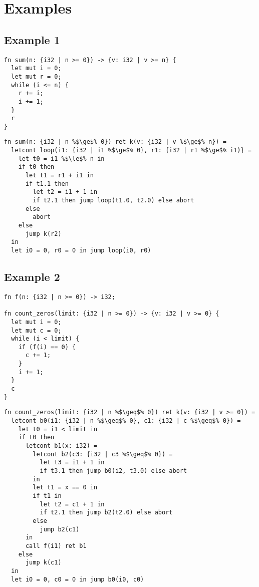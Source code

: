 \documentclass{article}
\begin{document}
\newpage

\section{Examples}

\subsection{Example 1}

\begin{verbatim}
fn sum(n: {i32 | n >= 0}) -> {v: i32 | v >= n} {
  let mut i = 0;
  let mut r = 0;
  while (i <= n) {
    r += i;
    i += 1;
  }
  r
}
\end{verbatim}

\begin{verbatim}
fn sum(n: {i32 | n %$\ge$% 0}) ret k(v: {i32 | v %$\ge$% n}) =
  letcont loop(i1: {i32 | i1 %$\ge$% 0}, r1: {i32 | r1 %$\ge$% i1)} =
    let t0 = i1 %$\le$% n in
    if t0 then
      let t1 = r1 + i1 in
      if t1.1 then
        let t2 = i1 + 1 in
        if t2.1 then jump loop(t1.0, t2.0) else abort
      else
        abort
    else
      jump k(r2)
  in
  let i0 = 0, r0 = 0 in jump loop(i0, r0)
\end{verbatim}

\newpage
\subsection{Example 2}

\begin{verbatim}
fn f(n: {i32 | n >= 0}) -> i32;

fn count_zeros(limit: {i32 | n >= 0}) -> {v: i32 | v >= 0} {
  let mut i = 0;
  let mut c = 0;
  while (i < limit) {
    if (f(i) == 0) {
      c += 1;
    }
    i += 1;
  }
  c
}
\end{verbatim}

\begin{verbatim}
fn count_zeros(limit: {i32 | n %$\geq$% 0}) ret k(v: {i32 | v >= 0}) =
  letcont b0(i1: {i32 | n %$\geq$% 0}, c1: {i32 | c %$\geq$% 0}) =
    let t0 = i1 < limit in
    if t0 then
      letcont b1(x: i32) =
        letcont b2(c3: {i32 | c3 %$\geq$% 0}) =
          let t3 = i1 + 1 in
          if t3.1 then jump b0(i2, t3.0) else abort
        in
        let t1 = x == 0 in
        if t1 in
          let t2 = c1 + 1 in
          if t2.1 then jump b2(t2.0) else abort
        else
          jump b2(c1)
      in
      call f(i1) ret b1
    else
      jump k(c1)
  in
  let i0 = 0, c0 = 0 in jump b0(i0, c0)
\end{verbatim}
\end{document}
